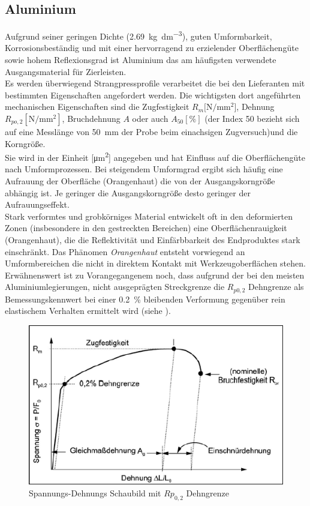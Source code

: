 \documentclass[12pt,a4paper,parskip,twoside,BCOR5mm,headsepline]{scrartcl}
\begin{document}
\subsection{Aluminium}
Aufgrund seiner geringen Dichte (\SI{2.69}{\kilo\gram\per\deci\meter\cubed})\autocite[353]{wm}, guten Umformbarkeit, Korrosionsbeständig und mit einer hervorragend zu erzielender Oberflächengüte sowie hohem Reflexionsgrad ist Aluminium das am häufigsten verwendete Ausgangsmaterial für Zierleisten.\\
 Es werden überwiegend Strangpressprofile verarbeitet die bei den Lieferanten mit bestimmten Eigenschaften angefordert werden. Die wichtigsten dort angeführten mechanischen Eigenschaften sind die Zugfestigkeit $R_m  [\si{\newton\per\milli\meter\squared}$], Dehnung $R_{po,2} [\si{\newton\per\milli\meter\squared}]$,   Bruchdehnung $A$ oder auch $A_{50} [\si{\percent}]$ (der Index 50 bezieht sich auf eine Messlänge  von \SI{50}{\milli\meter} der Probe  beim einachsigen Zugversuch)\autocite[281]{aa}und die Korngröße.\\
  Sie wird in der Einheit [\si{\micro\meter\squared}] angegeben und hat Einfluss auf die Oberflächengüte nach  Umformprozessen. Bei steigendem Umformgrad ergibt sich häufig eine Aufrauung der Oberfläche (Orangenhaut)\label{sec:orangenhaut} die von der Ausgangskorngröße abhängig ist. Je geringer die Ausgangskorngröße desto geringer der Aufrauungseffekt.\autocite[524]{aa}\\ Stark verformtes und grobkörniges Material entwickelt oft in den deformierten Zonen (insbesondere in den gestreckten Bereichen) eine Oberflächenrauigkeit (Orangenhaut), die die Reflektivität und Einfärbbarkeit des Endproduktes stark einschränkt. Das Phänomen \emph{Orangenhaut} entsteht vorwiegend an Umformbereichen die nicht in direktem Kontakt mit Werkzeugoberflächen stehen.\autocite[19]{hmp}
Erwähnenswert ist zu Vorangegangenem noch, dass aufgrund der bei den meisten Aluminiumlegierungen, nicht ausgeprägten Streckgrenze  die $R_{p0,2}$ Dehngrenze als Bemessungskennwert bei einer \SI{0.2}{\percent} bleibenden Verformung gegenüber rein elastischem Verhalten ermittelt wird (siehe ).
\begin{figure}[hbtp]
\centering
 	\includegraphics[width=.8\textwidth]{spanndehn2}
 	\caption[Spannungs-Dehnungs Schaubild]{Spannungs-Dehnungs Schaubild mit $Rp_{0,2} $ Dehngrenze\autocite[280-281]{aa}}
 	\label{fig:spanndehn2}
 	\end{figure}
 	
\end{document}
